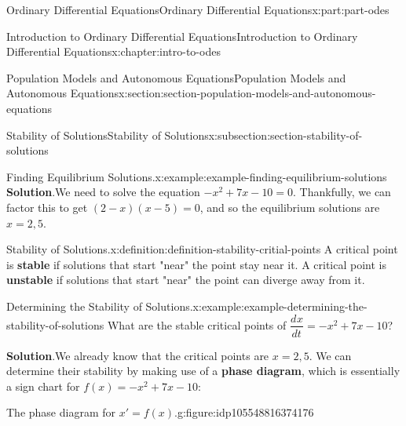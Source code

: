 \documentclass[twoside,10pt,]{book}
\newcommand{\blocktitlefont}{\relax}
\newcommand{\terminology}[1]{\textbf{#1}}
\numberwithin{equation}{part}
\providecommand{\dv}[3][]{\dfrac{d^{#1} #2}{d #3^{#1}}}
\begin{document}
\begin{partptx}{Ordinary Differential Equations}{}{Ordinary Differential Equations}{}{}{x:part:part-odes}
\begin{chapterptx}{Introduction to Ordinary Differential Equations}{}{Introduction to Ordinary Differential Equations}{}{}{x:chapter:intro-to-odes}
\begin{sectionptx}{Population Models and Autonomous Equations}{}{Population Models and Autonomous Equations}{}{}{x:section:section-population-models-and-autonomous-equations}
\begin{subsectionptx}{Stability of Solutions}{}{Stability of Solutions}{}{}{x:subsection:section-stability-of-solutions}
\begin{example}{Finding Equilibrium Solutions.}{x:example:example-finding-equilibrium-solutions}
\noindent\textbf{\blocktitlefont Solution}.\hypertarget{g:solution:idp105548816401184}{}\quad{}We need to solve the equation \(-x^{2} + 7x - 10 = 0\). Thankfully, we can factor this to get \((2-x)(x-5) = 0\), and so the equilibrium solutions are \(x = 2,5\).%
\end{example}
\begin{definition}{Stability of Solutions.}{x:definition:definition-stability-critial-points}%
A critical point is \terminology{stable} if solutions that start "near" the point stay near it. A critical point is \terminology{unstable} if solutions that start "near" the point can diverge away from it.%
\end{definition}
\begin{example}{Determining the Stability of Solutions.}{x:example:example-determining-the-stability-of-solutions}%
What are the stable critical points of \(\dv{x}{t} = -x^{2} + 7x - 10\)?%
\par\smallskip%
\noindent\textbf{\blocktitlefont Solution}.\hypertarget{g:solution:idp105548816372640}{}\quad{}We already know that the critical points are \(x = 2, 5\). We can determine their stability by making use of a \terminology{phase diagram}, which is essentially a sign chart for \(f(x) = -x^{2} + 7x - 10\):%
\begin{figureptx}{The phase diagram for \(x' = f(x).\)}{g:figure:idp105548816374176}{}%
\begin{image}{0.25}{0.5}{0.25}%
\end{image}
\end{figureptx}
\end{example}
\end{subsectionptx}
\end{sectionptx}
\end{chapterptx}
\end{partptx}
\end{document}
